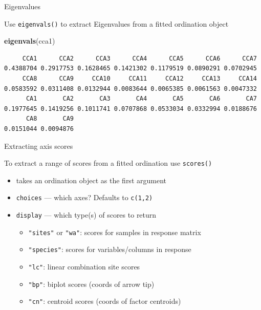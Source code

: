 \documentclass[10pt,ignorenonframetext,compress, aspectratio=169]{beamer}
\newenvironment{Shaded}{\begin{snugshade}}{\end{snugshade}}
\newcommand{\KeywordTok}[1]{\textcolor[rgb]{0.13,0.29,0.53}{\textbf{{#1}}}}
\newcommand{\NormalTok}[1]{{#1}}
\begin{document}
\begin{frame}[fragile]{Eigenvalues}

Use \texttt{eigenvals()} to extract Eigenvalues from a fitted ordination
object

\scriptsize

\begin{Shaded}
\begin{Highlighting}[]
\KeywordTok{eigenvals}\NormalTok{(cca1)}
\end{Highlighting}
\end{Shaded}

\begin{verbatim}
     CCA1      CCA2      CCA3      CCA4      CCA5      CCA6      CCA7 
0.4388704 0.2917753 0.1628465 0.1421302 0.1179519 0.0890291 0.0702945 
     CCA8      CCA9     CCA10     CCA11     CCA12     CCA13     CCA14 
0.0583592 0.0311408 0.0132944 0.0083644 0.0065385 0.0061563 0.0047332 
      CA1       CA2       CA3       CA4       CA5       CA6       CA7 
0.1977645 0.1419256 0.1011741 0.0707868 0.0533034 0.0332994 0.0188676 
      CA8       CA9 
0.0151044 0.0094876 
\end{verbatim}

\normalsize

\end{frame}

\begin{frame}{Extracting axis scores}

To extract a range of scores from a fitted ordination use
\texttt{scores()}

\begin{itemize}
\itemsep1pt\parskip0pt
\item
  takes an ordination object as the first argument
\item
  \texttt{choices} --- which axes? Defaults to \texttt{c(1,2)}
\item
  \texttt{display} --- which type(s) of scores to return

  \begin{itemize}
  \itemsep1pt\parskip0pt
  \item
    \texttt{"sites"} or \texttt{"wa"}: scores for samples in response
    matrix
  \item
    \texttt{"species"}: scores for variables/columns in response
  \item
    \texttt{"lc"}: linear combination site scores
  \item
    \texttt{"bp"}: biplot scores (coords of arrow tip)
  \item
    \texttt{"cn"}: centroid scores (coords of factor centroids)
  \end{itemize}
\end{itemize}

\end{frame}
\end{document}
